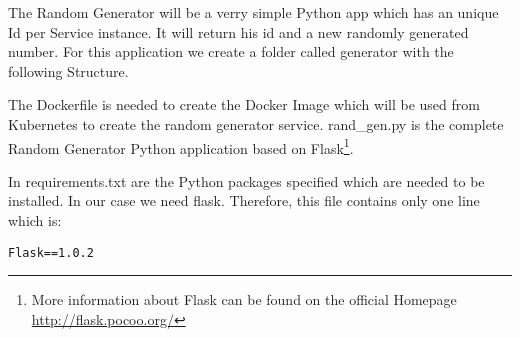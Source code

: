 The Random Generator will be a verry simple Python app which has an unique Id per Service instance. It will return his id and a new randomly generated number. For this application we create a folder called generator with the following Structure.

The Dockerfile is needed to create the Docker Image which will be used from Kubernetes to create the random generator service.
rand\_gen.py is the complete Random Generator Python application based on Flask\footnote{More information about Flask can be found on the official Homepage \url{http://flask.pocoo.org/}}.
 
In requirements.txt are the Python packages specified which are needed to be installed. In our case we need flask. Therefore, this file contains only one line which is:
\begin{verbatim}
Flask==1.0.2
\end{verbatim}


